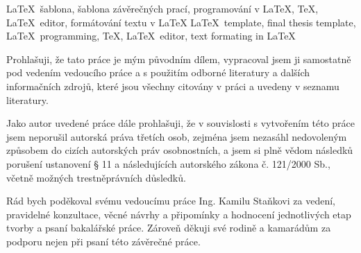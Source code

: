 \documentclass[12pt,a4paper,twoside]{book}
\begin{document}
\klicovaslova
{\LaTeX\ šablona, šablona závěrečných prací, programování v \LaTeX, \TeX, \LaTeX\ editor, formátování textu v \LaTeX}
{\LaTeX\ template, final thesis template, \LaTeX\ programming, \TeX, \LaTeX\ editor, text formating in \LaTeX}

\citace

\prohlaseni
{Prohlašuji, že tato práce je mým původním dílem, vypracoval jsem ji samostatně pod vedením vedoucího práce a s použitím odborné literatury a dalších informačních zdrojů, které jsou všechny citovány v práci a uvedeny v seznamu literatury.

Jako autor uvedené práce dále prohlašuji, že v souvislosti s vytvořením této práce jsem neporušil autorská práva třetích osob, zejména jsem nezasáhl nedovoleným způsobem do cizích autorských práv osobnostních, a jsem si plně vědom následků porušení ustanovení § 11 a následujících autorského zákona č. 121/2000 Sb., včetně možných trestněprávních důsledků.}

\podekovani
{Rád bych poděkoval svému vedoucímu práce Ing. Kamilu Staňkovi za vedení, pravidelné konzultace, věcné návrhy a připomínky a hodnocení jednotlivých etap tvorby a psaní bakalářské práce. Zároveň děkuji své rodině a kamarádům za podporu nejen při psaní této závěrečné práce.}

\obsah








\end{document}
